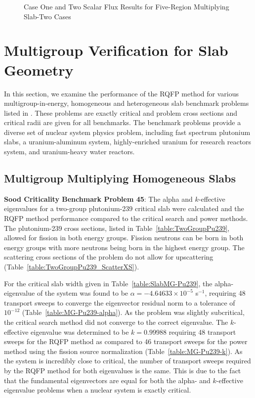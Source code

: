 \begin{figure}[!htbp]
	\centering
	\resizebox{0.75\textwidth}{!}{
	
	}
	\caption{Case One and Two Scalar Flux Results for Five-Region Multiplying Slab-Two Cases}
	\label{fig:FiveRegionMultiply}
\end{figure}

\clearpage

\section{Multigroup Verification for Slab Geometry}

In this section, we examine the performance of the RQFP method for various multigroup-in-energy, homogeneous and heterogeneous slab benchmark problems listed in \cite{sood2003analytical}. These problems are exactly critical and problem cross sections and critical radii are given for all benchmarks. The benchmark problems provide a diverse set of nuclear system physics problem, including fast spectrum plutonium slabs, a uranium-aluminum system, highly-enriched uranium for research reactors system, and uranium-heavy water reactors.

\subsection{Multigroup Multiplying Homogeneous Slabs}

\textbf{Sood Criticality Benchmark Problem 45}: The alpha and $k$-effective eigenvalues for a two-group plutonium-239 critical slab were calculated and the RQFP method performance compared to the critical search and power methods. The plutonium-239 cross sections, listed in Table~\ref{table:TwoGroupPu239}, allowed for fission in both energy groups. Fission neutrons can be born in both energy groups with more neutrons being born in the highest energy group. The scattering cross sections of the problem do not allow for upscattering (Table~\ref{table:TwoGroupPu239_ScatterXS}).

For the critical slab width given in Table~\ref{table:SlabMG-Pu239}, the alpha-eigenvalue of the system was found to be $\alpha = -4.64633 \times 10^{-5}$ s$^{-1}$, requiring 48 transport sweeps to converge the eigenvector residual norm to a tolerance of $10^{-12}$ (Table~\ref{table:MG-Pu239-alpha}). As the problem was slightly subcritical, the critical search method did not converge to the correct eigenvalue. The $k$-effective eigenvalue was determined to be $k=0.99988$ requiring 48 transport sweeps for the RQFP method as compared to 46 transport sweeps for the power method using the fission source normalization (Table~\ref{table:MG-Pu239-k}). As the system is incredibly close to critical, the number of transport sweeps required by the RQFP method for both eigenvalues is the same. This is due to the fact that the fundamental eigenvectors are equal for both the alpha- and $k$-effective eigenvalue problems when a nuclear system is exactly critical.

